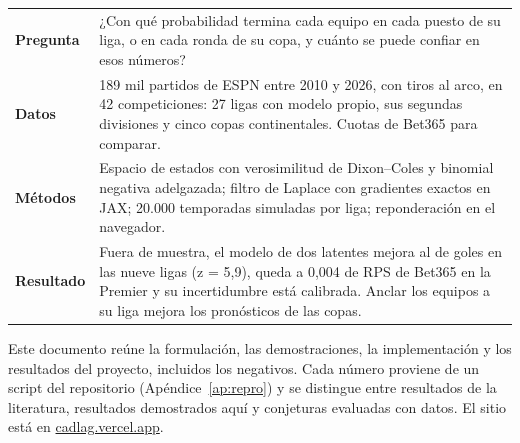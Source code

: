 \vspace*{12.4cm}
\begin{center}
\begin{minipage}{0.86\textwidth}
\renewcommand{\arraystretch}{1.35}
\begin{tabularx}{\textwidth}{@{}>{\leavevmode\sffamily\bfseries\small\color{cdpurple}}p{2.5cm}L@{}}
Pregunta & ¿Con qué probabilidad termina cada equipo en cada puesto de su liga, o en cada ronda de su copa, y cuánto se puede confiar en esos números? \\
Datos & 189 mil partidos de ESPN entre 2010 y 2026, con tiros al arco, en 42 competiciones: 27 ligas con modelo propio, sus segundas divisiones y cinco copas continentales. Cuotas de Bet365 para comparar. \\
Métodos & Espacio de estados con verosimilitud de Dixon–Coles y binomial negativa adelgazada; filtro de Laplace con gradientes exactos en JAX; 20.000 temporadas simuladas por liga; reponderación en el navegador. \\
Resultado & Fuera de muestra, el modelo de dos latentes mejora al de goles en las nueve ligas (z = 5,9), queda a 0,004 de RPS de Bet365 en la Premier y su incertidumbre está calibrada. Anclar los equipos a su liga mejora los pronósticos de las copas. \\
\end{tabularx}
\end{minipage}

\vspace{0.9cm}
\begin{minipage}{0.86\textwidth}
\small\color{cdgray}\linespread{1.15}\selectfont
Este documento reúne la formulación, las demostraciones, la implementación y los resultados del proyecto, incluidos los negativos. Cada número proviene de un script del repositorio (Apéndice~\ref{ap:repro}) y se distingue entre resultados de la literatura, resultados demostrados aquí y conjeturas evaluadas con datos. El sitio está en \href{https://cadlag.vercel.app}{\color{cdblue}cadlag.vercel.app}.
\end{minipage}
\end{center}
\clearpage
